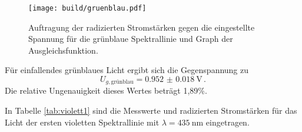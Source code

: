 \begin{figure}
  \centering
  \texttt{[image: build/gruenblau.pdf]}
  \caption{Auftragung der radizierten Stromstärken gegen die eingestellte Spannung für die grünblaue Spektrallinie und Graph der Ausgleichsfunktion.}
  \label{fig:grünblau}
\end{figure}

Für einfallendes grünblaues Licht ergibt sich die Gegenspannung zu
\begin{equation*}
  U_{g,\text{grünblau}} = \SI{0.952(0018)}{\volt}\,.
\end{equation*}
Die relative Ungenauigkeit dieses Wertes beträgt 1,89\%.

In Tabelle \ref{tab:violett1} sind die Messwerte und radizierten Stromstärken
für das Licht der ersten violetten Spektrallinie mit $\lambda = \SI{435}{\nano\meter}$
eingetragen.


